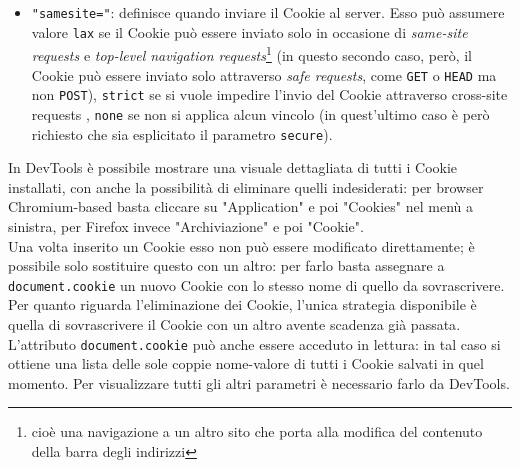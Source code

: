 \documentclass[a4paper, 12pt, twoside, openright]{book}
\begin{document}
\begin{itemize}
\item\texttt{"samesite="}: definisce quando inviare il Cookie al server\cite{MDN_Web_docs:cookies}. Esso può assumere valore \texttt{lax} se il Cookie può essere inviato solo in occasione di \textit{same-site requests} e \textit{top-level navigation requests}\footnote{cioè una navigazione a un altro sito che porta alla modifica del contenuto della barra degli indirizzi\cite{Stack_overflow:samesite}}\cite{MDN_Web_docs:cookies} (in questo secondo caso, però, il Cookie può essere inviato solo attraverso \textit{safe requests}, come \texttt{GET} o \texttt{HEAD} ma non \texttt{POST}\cite{Stack_overflow:samesite}), \texttt{strict} se si vuole impedire l'invio del Cookie attraverso cross-site requests \cite{MDN_Web_docs:cookies}, \texttt{none} se non si applica alcun vincolo\cite{MDN_Web_docs:cookies} (in quest'ultimo caso è però richiesto che sia esplicitato il parametro \texttt{secure}\cite{MDN_Web_docs:HTTP_cookies}).
\end{itemize}
In DevTools è possibile mostrare una visuale dettagliata di tutti i Cookie installati, con anche la possibilità di eliminare quelli indesiderati: per browser Chromium-based basta cliccare su "Application" e poi "Cookies" nel menù a sinistra, per Firefox invece "Archiviazione" e poi "Cookie".\\
Una volta inserito un Cookie esso non può essere modificato direttamente; è possibile solo sostituire questo con un altro: per farlo basta assegnare a \texttt{document.cookie} un nuovo Cookie con lo stesso nome di quello da sovrascrivere\cite{W3Schools:cookies}.\\
Per quanto riguarda l'eliminazione dei Cookie, l'unica strategia disponibile è quella di sovrascrivere il Cookie con un altro avente scadenza già passata\cite{W3Schools:cookies}.\\
L'attributo \texttt{document.cookie} può anche essere acceduto in lettura: in tal caso si ottiene una lista delle sole coppie nome-valore di tutti i Cookie salvati in quel momento\cite{MDN_Web_docs:cookies}. Per visualizzare tutti gli altri parametri è necessario farlo da DevTools.
\backmatter

\begingroup %
  \makeatletter
  \let\ps@plain\ps@empty
  \makeatother
  
\endgroup
\end{document}
